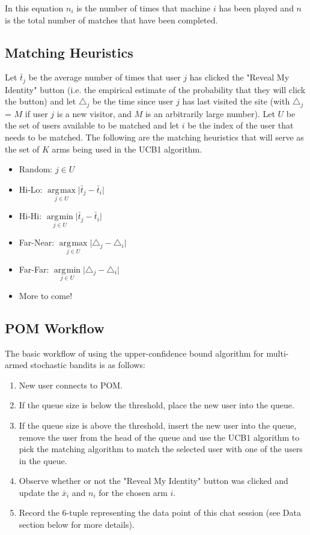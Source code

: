 \documentclass{article}
\DeclareMathOperator*{\argmin}{\arg\!\min}
\DeclareMathOperator*{\argmax}{\arg\!\max}
\begin{document}
In this equation $n_i$ is the number of times that machine $i$ has been played and $n$ is the total number of matches that have been completed.

\subsection{Matching Heuristics}

Let $\bar{t}_j$ be the average number of times that user $j$ has clicked the "Reveal My Identity" button (i.e. the empirical estimate of the probability that they will click the button) and let $\triangle_j$ be the time since user $j$ has last visited the site (with $\triangle_j$ = $M$ if user $j$ is a new visitor, and $M$ is an arbitrarily large number). Let $U$ be the set of users available to be matched and let $i$ be the index of the user that needs to be matched. The following are the matching heuristics that will serve as the set of $K$ arms being used in the UCB1 algorithm.

\begin{itemize}
  \item Random: $ j \in{U} $
  \item Hi-Lo: $\underset{j \in{U}}{\argmax} \lvert{\bar{t}_j - \bar{t}_i}\rvert\ $
  \item Hi-Hi: $\underset{j \in{U}}{\argmin} \lvert{\bar{t}_j - \bar{t}_i}\rvert\ $
  \item Far-Near: $\underset{j \in{U}}{\argmax} \lvert{\triangle_j - \triangle_i}\rvert\ $
  \item Far-Far: $\underset{j \in{U}}{\argmin} \lvert{\triangle_j - \triangle_i}\rvert\ $
  \item More to come!
\end{itemize}

\subsection{POM Workflow}

The basic workflow of using the upper-confidence bound algorithm for multi-armed stochastic bandits is as follows: 

\begin{enumerate}
\item New user connects to POM.
\item If the queue size is below the threshold, place the new user into the queue.
\item If the queue size is above the threshold, insert the new user into the queue, remove the user from the head of the queue and use the UCB1 algorithm to pick the matching algorithm to match the selected user with one of the users in the queue. 
\item Observe whether or not the "Reveal My Identity" button was clicked and update the $\bar{x}_i$ and $n_i$ for the chosen arm $i$.
\item Record the 6-tuple representing the data point of this chat session (see Data section below for more details).
\end{enumerate}
\end{document}
